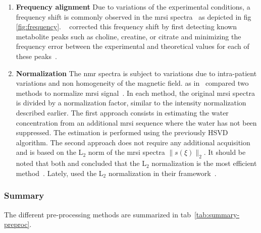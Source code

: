 \begin{enumerate}[leftmargin=*]
\item[] \textbf{Frequency alignment}
Due to variations of the experimental conditions, a frequency shift is commonly
observed in the \ac{mrsi} spectra~\cite{Chen2002,Osorio-Garcia2012} as depicted
in \acs{fig}\,\ref{fig:frequency}.
\citeauthor{Tiwari2012}~\cite{Tiwari2012} corrected this frequency shift by
first detecting known metabolite peaks such as choline, creatine, or citrate
and minimizing the frequency error between the experimental and theoretical
values for each of these peaks~\cite{Tiwari2012}.

\item[] \textbf{Normalization}
The \ac{nmr} spectra is subject to variations due to intra-patient variations
and non homogeneity of the magnetic field.
\citeauthor{Parfait2012} as in~\cite{Devos2004} compared two methods to
normalize \ac{mrsi} signal~\cite{Parfait2012}.
In each method, the original \ac{mrsi} spectra is divided by a normalization
factor, similar to the intensity normalization described earlier.
The first approach consists in estimating the water concentration from an
additional \ac{mrsi} sequence where the water has not been suppressed.
The estimation is performed using the previously HSVD algorithm.
The second approach does not require any additional acquisition and is based on
the L$_2$ norm of the \ac{mrsi} spectra $\|s(\xi)\|_2$.
It should be noted that both \citeauthor{Parfait2012} and
\citeauthor{Devos2004} concluded that the L$_2$ normalization is the most
efficient method~\cite{Parfait2012}.
Lately, \citeauthor{trigui2017automatic} used the L$_2$ normalization in their
framework~\cite{trigui2016classification,trigui2017automatic}.

\end{enumerate}

\subsubsection{Summary}

The different pre-processing methods are summarized in \acs{tab}~\ref{tab:summary-preproc}.

